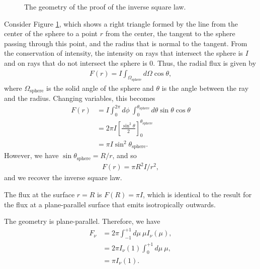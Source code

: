 \newslide

\begin{problem}

\begin{figure}[bp]
\centering
{}
\caption{The geometry of the proof of the inverse square law.}
\label{fig-inverse-square-law}
\end{figure}

Consider Figure \ref{fig-inverse-square-law}, which shows a right
triangle formed by the line from the center of the sphere to a point $r$
from the center, the tangent to the sphere passing through this point,
and the radius that is normal to the tangent. From the conservation of
intensity, the intensity on rays that intersect the sphere is $I$ and on
rays that do not intersect the sphere is 0. Thus, the radial flux is
given by
\begin{align}
F(r) = I \int_{\Omega_\mathrm{sphere}}\!\!\!\!\!\!d\Omega
\cos\theta,
\end{align}
where $\Omega_\mathrm{sphere}$ is the solid angle of the
sphere and $\theta$ is the angle between the ray and the
radius. Changing variables, this becomes
\begin{align}
F(r) &= I
\int_0^{2\pi}\!\!\!d\phi\:
\int_0^{\theta_\mathrm{sphere}}\!\!\!d\theta \sin\theta
\cos\theta\\
&=
2\pi I \left[\frac{\sin^2\theta}{2}\right]_0^{\theta_\mathrm{sphere}}\\
&=
\pi I \sin^2\theta_\mathrm{sphere}.
\end{align}
However, we have $\sin\theta_\mathrm{sphere} = R / r$, and so
\begin{align}
F(r) = \pi R^2 I / r^2,
\end{align}
and we recover the inverse square law.

The flux at the surface $r = R$ is $F(R) = \pi I$, which is
identical to the result for the flux at a plane-parallel
surface that emits isotropically outwards.

\end{problem}

\newslide

\begin{problem}
The geometry is plane-parallel. Therefore, we have
\begin{align}
F_\nu &= 2\pi\int_{-1}^{+1}\!\!\!d\mu\:\mu I_\nu(\mu),\\
      &= 2\pi I_\nu(1)\int_{0}^{+1}\!\!\!d\mu\:\mu,\\
      &= \pi I_\nu(1).
\end{align}
\end{problem}

